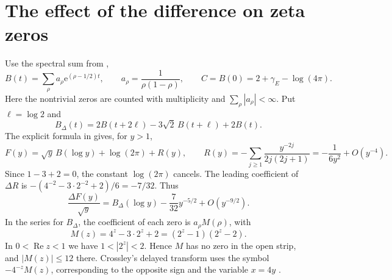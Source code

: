\documentclass[11pt,a4paper]{article}
\newcommand{\e}{\mathrm e}
\newcommand{\Rea}{\operatorname{Re}}
\begin{document}
\section{The effect of the difference on zeta zeros}

Use the spectral sum from \cite{cone,windows},
\[
 B(t)=\sum_\rho a_\rho\e^{(\rho-1/2)t},\qquad
 a_\rho=\frac1{\rho(1-\rho)},\qquad
 C=B(0)=2+\gamma_E-\log(4\pi).
\]
Here the nontrivial zeros are counted with multiplicity and
\(\sum_\rho |a_\rho|<\infty\). Put \(\ell=\log2\) and
\[
 B_\Delta(t)=2B(t+2\ell)-3\sqrt2\,B(t+\ell)+2B(t).
\]
The explicit formula in \cite[Section~2]{cone} gives, for \(y>1\),
\[
 F(y)=\sqrt y\,B(\log y)+\log(2\pi)+R(y),\qquad
 R(y)=-\sum_{j\ge1}\frac{y^{-2j}}{2j(2j+1)}
     =-\frac1{6y^2}+O(y^{-4}).
\]
Since \(1-3+2=0\), the constant \(\log(2\pi)\) cancels.
The leading coefficient of \(\Delta R\) is
\(-(4^{-2}-3\cdot2^{-2}+2)/6=-7/32\). Thus
\begin{equation}\label{eq:remainder}
 \frac{\Delta F(y)}{\sqrt y}
 =B_\Delta(\log y)-\frac7{32}y^{-5/2}+O(y^{-9/2}).
\end{equation}
In the series for \(B_\Delta\), the coefficient of each zero is
\(a_\rho M(\rho)\), with
\begin{equation}\label{eq:multiplier}
 M(z)=4^z-3\cdot2^z+2=(2^z-1)(2^z-2).
\end{equation}
In \(0<\Rea z<1\) we have \(1<|2^z|<2\). Hence \(M\) has no zero
in the open strip, and \(|M(z)|\le12\) there. Crossley's delayed
transform uses the symbol \(-4^{-z}M(z)\), corresponding to the
opposite sign and the variable \(x=4y\) \cite{crossley}.
\end{document}
